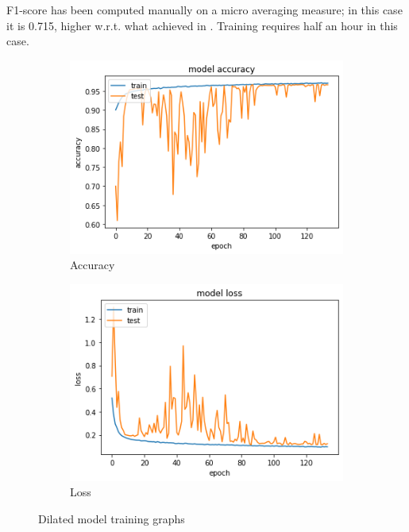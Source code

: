 \documentclass{article}
\begin{document}
F1-score has been computed manually on a micro averaging measure; in this case it is 0.715, higher w.r.t. what achieved in \cite{drossos2020sound}. Training requires half an hour in this case.

\begin{figure}[H]
	\centering
	\begin{subfigure}{.5\textwidth}
		\centering
		\includegraphics[width=.9\linewidth]{./images/poly/dilated_acc.png}
		\caption{Accuracy}
	\end{subfigure}%
	\begin{subfigure}{.5\textwidth}
		\centering
		\includegraphics[width=.9\linewidth]{./images/poly/dilated_loss.png}
		\caption{Loss}
	\end{subfigure}
	\caption{Dilated model training graphs}
	\label{fig:poly_dil_result}
\end{figure}
 
\end{document}
